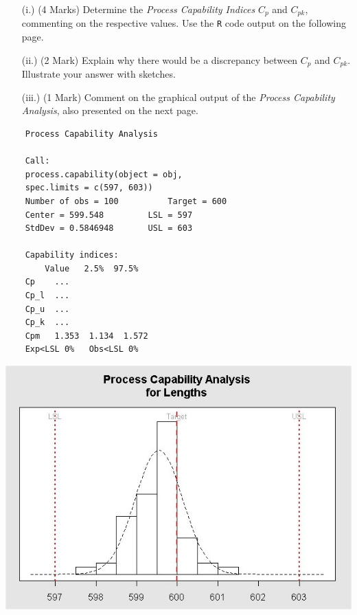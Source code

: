\documentclass[a4paper,12pt]{article}
\begin{document}
\begin{itemize}
	\item[(i.)] (4 Marks) Determine the \emph{Process Capability Indices} $C_p$ and $C_{pk}$, commenting on the respective values. Use the \texttt{R} code output on the following page.
	\item[(ii.)] (2 Mark)  Explain why there would be a discrepancy between $C_p$ and $C_{pk}$. Illustrate your answer with sketches.
	\item[(iii.)] (1 Mark) Comment on the graphical output of the \emph{Process Capability Analysis}, also presented on the next page.
\end{itemize}




\newpage
\begin{framed}
	\begin{verbatim}
	Process Capability Analysis
	
	Call:
	process.capability(object = obj,  
	spec.limits = c(597, 603))
	Number of obs = 100          Target = 600
	Center = 599.548         LSL = 597
	StdDev = 0.5846948       USL = 603
	
	Capability indices:
	    Value   2.5%  97.5%
	Cp    ...
	Cp_l  ...
	Cp_u  ...
	Cp_k  ...
	Cpm   1.353  1.134  1.572
	Exp<LSL 0%   Obs<LSL 0%
	\end{verbatim}
\end{framed}



\begin{center}
	\includegraphics[scale=0.55]{image/ExamQ4hist}
\end{center}
\newpage
%
%
%
\end{document}
